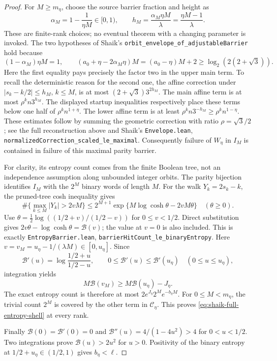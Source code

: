 \documentclass[11pt]{article}
\theoremstyle{remark}\newtheorem{remark}[proposition]{Remark}
\begin{document}
\begin{proof}
For \(M\ge m_\eta\), choose the source barrier fraction and height as
\[
 \alpha_M=1-\frac1{\eta M}\in[0,1),\qquad
 h_M=\frac{\alpha_M\eta M}{\lambda}
     =\frac{\eta M-1}{\lambda}.
\]
These are finite-rank choices; no eventual theorem with a changing
parameter is invoked. The two hypotheses of Shaik's
\texttt{orbit\_envelope\_of\_adjustableBarrier} hold because
\[
 (1-\alpha_M)\eta M=1,\qquad
 (a_0+\eta-2\alpha_M\eta)M=(a_0-\eta)M+2
 \ge\log_2(2(2+\sqrt3)).
\]
Here the first equality pays precisely the factor two in the upper
main term. To recall the deterministic reason for the second one,
the affine correction under
\(|s_k-k/2|\le h_M\), \(k\le M\), is at most
\((2+\sqrt3)3^{2h_M}\).
The main affine term is at most
\(\rho^k n3^{h_M}\).
The displayed startup inequalities respectively place these terms below
one half of \(\rho^k n^{1+\eta}\).
The lower affine term is at least
\(\rho^k n3^{-h_M}\ge\rho^k n^{1-\eta}\).
These estimates follow by summing the geometric correction with ratio
\(\rho=\sqrt3/2\); see the full reconstruction above and
Shaik's \texttt{Envelope.lean},
\texttt{normalizedCorrection\_scaled\_le\_maximal}.
Consequently failure of \(W_\eta\) in \(I_M\) is contained in failure
of this maximal parity barrier.

For clarity, its entropy count comes from the finite Boolean tree, not
an independence assumption along unbounded integer orbits. The parity
bijection identifies \(I_M\) with the \(2^M\) binary words of length \(M\).
For the walk \(Y_k=2s_k-k\), the pruned-tree cosh inequality gives
\[
 \#\{\max_{k\le M}|Y_k|>2vM\}
 \le 2^{M+1}\exp\{M\log\cosh\theta-2vM\theta\}
 \quad(\theta\ge0).
\]
Use
\(\theta=\frac12\log((1/2+v)/(1/2-v))\) for \(0\le v<1/2\).
Direct substitution gives
\(2v\theta-\log\cosh\theta=\mathcal B(v)\);
the value at \(v=0\) is also included. This is exactly
\texttt{EntropyBarrier.lean}, \texttt{barrierHitCount\_le\_binaryEntropy}.
Here \(v=v_M=u_\eta-1/(\lambda M)\in[0,u_\eta]\).
Since
\[
 \mathcal B'(u)=\log\frac{1/2+u}{1/2-u},
 \qquad
 0\le\mathcal B'(u)\le\mathcal B'(u_\eta)
 \quad(0\le u\le u_\eta),
\]
integration yields
\[
 M\mathcal B(v_M)\ge M\mathcal B(u_\eta)-J_\eta.
\]
The exact entropy count is therefore at most
\(2e^{J_\eta}2^Me^{-b_\eta M}\).
For \(0\le M<m_\eta\), the trivial count \(2^M\) is covered by
the other term in \(\mathcal C_\eta\).
This proves \eqref{eq:shaik-full-entropy-shell} at every rank.

Finally \(\mathcal B(0)=\mathcal B'(0)=0\) and
\(\mathcal B''(u)=4/(1-4u^2)>4\) for \(0<u<1/2\).
Two integrations prove \(\mathcal B(u)>2u^2\) for \(u>0\).
Positivity of the binary entropy at \(1/2+u_\eta\in(1/2,1)\)
gives \(b_\eta<\ell\).
\end{proof}
\end{document}
